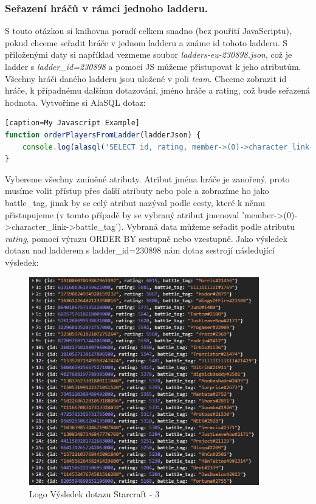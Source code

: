 \documentclass[a4, titlepage]{article}
\begin{document}
\subsubsection{Seřazení hráčů v rámci jednoho ladderu.}
S touto otázkou si knihovna poradí celkem snadno (bez pouřití JavaScriptu), pokud chceme seřadit hráče v jednom ladderu a známe id tohoto ladderu. S přiloženými daty si například vezmeme soubor \textit{ladders-eu-230898.json}, což je ladder s \textit{ladder\_id=230898} a pomocí JS můžeme přistupovat k jeho atributům. Všechny hráči daného ladderu jsou uložené v poli \textit{team}. Chceme zobrazit id hráče, k případnému dalšímu dotazování, jméno hráče a rating, což bude seřazená hodnota. Vytvoříme si AlaSQL dotaz:
\begin{lstlisting}[language=JavaScript][caption=My Javascript Example]
function orderPlayersFromLadder(ladderJson) {
    console.log(alasql('SELECT id, rating, member->(0)->character_link->battle_tag AS battle_tag FROM ? ORDER BY rating DESC', [ladderJson.team]));
}
\end{lstlisting}
Vybereme všechny zmíněné atributy. Atribut jména hráče je zanořený, proto musíme volit přístup přes další atributy nebo pole a zobrazíme ho jako battle\_tag, jinak by se celý atribut nazýval podle cesty, které k němu přistupujeme (v tomto případě by se vybraný atribut jmenoval 'member->(0)->character\_link->battle\_tag'). 
Vybraná data můžeme seřadit podle atributu \textit{rating}, pomocí výrazu ORDER BY sestupně nebo vzestupně. Jako výsledek dotazu nad ladderem s ladder\_id=230898 nám dotaz sestrojí následující výsledek:

\begin{figure}[h]
    \centering
    \includegraphics[width=10cm]{S3}
    \caption{Logo Výsledek dotazu Starcraft - 3}
\end{figure}
\end{document}
